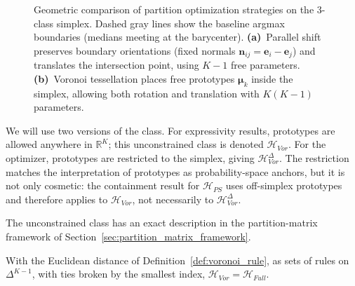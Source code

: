 \begin{figure}[H]
    \centering
    \resizebox{0.65\textwidth}{!}{}
    \caption{Geometric comparison of partition optimization strategies on the 3-class simplex. Dashed gray lines show the baseline argmax boundaries (medians meeting at the barycenter). \textbf{(a)}~Parallel shift preserves boundary orientations (fixed normals $\mathbf{n}_{ij} = \mathbf{e}_i - \mathbf{e}_j$) and translates the intersection point, using $K{-}1$ free parameters. \textbf{(b)}~Voronoi tessellation places free prototypes $\boldsymbol{\mu}_k$ inside the simplex, allowing both rotation and translation with $K(K{-}1)$ parameters.}\label{fig:partition_strategies}
\end{figure}

We will use two versions of the class. For expressivity results, prototypes are allowed anywhere in $\mathbb{R}^K$; this unconstrained class is denoted $\mathcal{H}_{Vor}$. For the optimizer, prototypes are restricted to the simplex, giving $\mathcal{H}_{Vor}^{\Delta}$. The restriction matches the interpretation of prototypes as probability-space anchors, but it is not only cosmetic: the containment result for $\mathcal{H}_{PS}$ uses off-simplex prototypes and therefore applies to $\mathcal{H}_{Vor}$, not necessarily to $\mathcal{H}_{Vor}^{\Delta}$.

The unconstrained class has an exact description in the partition-matrix framework of Section~\ref{sec:partition_matrix_framework}.

\begin{proposition}\label{prop:voronoi_full_equality}
    With the Euclidean distance of Definition~\ref{def:voronoi_rule}, as sets of rules on $\Delta^{K-1}$, with ties broken by the smallest index, $\mathcal{H}_{Vor} = \mathcal{H}_{Full}$.
\end{proposition}

